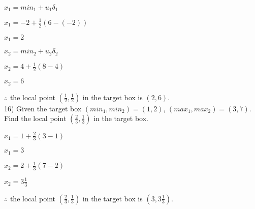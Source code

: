 \documentclass[a4paper]{article}
\begin{document}
$x_1 = min_1+u_1\delta_1$

$x_1 = -2+\frac{1}{2}(6-(-2))$

$x_1 = 2$

$x_2 = min_2+u_2\delta_2$

$x_2 = 4+\frac{1}{2}(8-4)$

$x_2 = 6$

$\therefore$ the local point $(\frac{1}{2},\frac{1}{2})$ in the target box is $(2,6)$.\\

16) Given the target box $(min_1, min_2) = (1,2)$, $(max_1, max_2) = (3,7)$. Find the local point $(\frac{2}{3},\frac{1}{3})$ in the target box.

$x_1 = 1+\frac{2}{3}(3-1)$

$x_1 = 3$

$x_2 = 2+\frac{1}{3}(7-2)$

$x_2 = 3\frac{1}{3}$

$\therefore$ the local point $(\frac{2}{3},\frac{1}{3})$ in the target box is $(3, 3\frac{1}{3})$.\\
\end{document}
